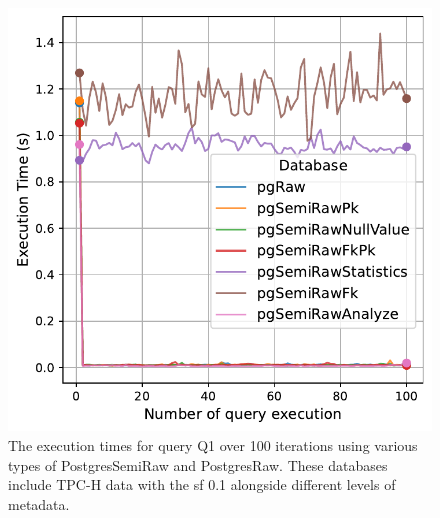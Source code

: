 \begin{figure}[hbt!]
\centering
\includegraphics[width=1.0\linewidth]{charts-eval-exp-time/execution_time_db_type_Q1.pdf}
\caption[Q1:result]{The execution times for query Q1 over 100 iterations using various types of PostgresSemiRaw and PostgresRaw. These databases include TPC-H data with the \acrshort{sf} 0.1 alongside different levels of metadata.}
\label{fig:execution_time_db_type_Q1}
\end{figure}
